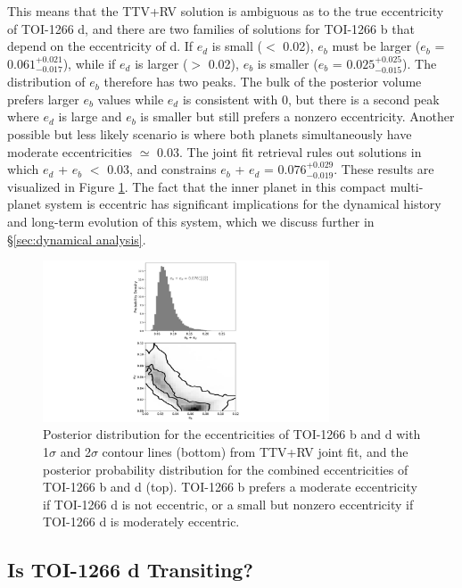 \documentclass[twocolumn]{aastex631}
\begin{document}
This means that the TTV+RV solution is ambiguous as to the true eccentricity of TOI-1266 d, and there are two families of solutions for TOI-1266 b that depend on the eccentricity of d. If $e_d$ is small ($<$ 0.02), $e_b$ must be larger ($e_b$ = ${0.061}^{+0.021}_{-0.017}$), while if $e_d$ is larger ($>$ 0.02), $e_b$ is smaller ($e_b$ = ${0.025}^{+0.025}_{-0.015}$). The distribution of $e_b$ therefore has two peaks. The bulk of the posterior volume prefers larger $e_b$ values while $e_d$ is consistent with 0, but there is a second peak where $e_d$ is large and $e_b$ is smaller but still prefers a nonzero eccentricity. Another possible but less likely scenario is where both planets simultaneously have moderate eccentricities $\simeq$ 0.03. The joint fit retrieval rules out solutions in which $e_d$ + $e_b$ $<$ 0.03, and constrains $e_b$ + $e_d$ = ${0.076}^{+0.029}_{-0.019}$. These results are visualized in Figure \ref{fig:bd_ecc_plot}. The fact that the inner planet in this compact multi-planet system is eccentric has significant implications for the dynamical history and long-term evolution of this system, which we discuss further in \S\ref{sec:dynamical analysis}.

\begin{figure}
\begin{center}
  \includegraphics[width=8.5cm]{New_bd_ecc_fig.pdf}
  \caption{Posterior distribution for the eccentricities of TOI-1266 b and d with 1$\sigma$ and 2$\sigma$ contour lines (bottom) from TTV+RV joint fit, and the posterior probability distribution for the combined eccentricities of TOI-1266 b and d (top). TOI-1266 b prefers a moderate eccentricity if TOI-1266 d is not eccentric, or a small but nonzero eccentricity if TOI-1266 d is moderately eccentric.}
  \label{fig:bd_ecc_plot}
\end{center}
\end{figure}



\subsection{Is TOI-1266 d Transiting?} \label{sec:non-transiting search}
\end{document}
